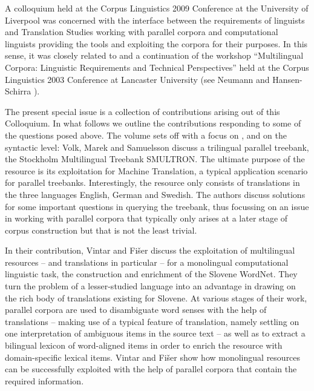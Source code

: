 \documentclass[output=paper]{LSP/langsci}
\begin{document}
A colloquium held at the Corpus Linguistics 2009 Conference at the University of Liverpool was concerned with the interface between the requirements of linguists and Translation Studies working with parallel corpora and computational linguists providing the tools and exploiting the corpora for their purposes. In this sense, it was closely related to and a continuation of the workshop ``Multilingual Corpora: Linguistic Requirements and Technical Perspectives'' held at the Corpus Linguistics 2003 Conference at Lancaster University (see Neumann and Hansen-Schirra \citealt{Neumann2003}).

The present special issue is a collection of contributions arising out of this Colloquium. In what follows we outline the contributions responding to some of the questions posed above. The volume sets off with a focus on ,  and  on the syntactic level: Volk, Marek and Samuelsson discuss a trilingual parallel treebank, the Stockholm Multilingual Treebank SMULTRON. The ultimate purpose of the resource is its exploitation for Machine Translation, a typical application scenario for parallel treebanks. Interestingly, the resource only consists of translations in the three languages English, German and Swedish. The authors discuss solutions for some important questions in querying the treebank, thus focussing on an issue in working with parallel corpora that typically only arises at a later stage of corpus construction but that is not the least trivial.

\largerpage
In their contribution, Vintar and Fišer discuss the exploitation of multilingual resources -- and translations in particular -- for a monolingual computational linguistic task, the construction and enrichment of the Slovene WordNet. They turn the problem of a lesser-studied language into an advantage in drawing on the rich body of translations existing for Slovene. At various stages of their work, parallel corpora are used to disambiguate word senses with the help of translations -- making use of a typical feature of translation, namely settling on one interpretation of ambiguous items in the source text -- as well as to extract a bilingual lexicon of word-aligned items in order to enrich the resource with domain-specific lexical items. Vintar and Fišer show how monolingual resources can be successfully exploited with the help of parallel corpora that contain the required information.
\end{document}
